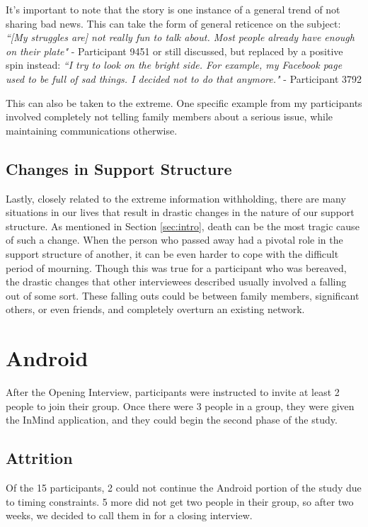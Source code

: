   It's important to note that the story is one instance of a general
  trend of not sharing bad news.
  This can take the form of general reticence on the subject:
  \textit{
  ``[My struggles are] not really fun to talk about.
  Most people already have enough on their plate"
  }
  - Participant 9451
  or still discussed, but replaced by a positive spin instead:
  \textit{
  ``I try to look on the bright side.
  For example, my Facebook page used to be full of sad things.
  I decided not to do that anymore."
  } - Participant 3792
  
  This can also be taken to the extreme.
  One specific example from my participants involved
  completely not telling family members about a serious issue,
  while maintaining communications otherwise.

  \subsection{Changes in Support Structure}
  Lastly, closely related to the extreme information withholding,
  there are many situations in our lives that result in
  drastic changes in the nature of our support structure.
  As mentioned in Section \ref{sec:intro},
  death can be the most tragic cause of such a change.
  When the person who passed away had a pivotal role in the support
  structure of another, it can be even harder to cope with
  the difficult period of mourning.
  Though this was true for a participant who was bereaved,
  the drastic changes that other interviewees described usually involved
  a falling out of some sort.
  These falling outs could be between family members,
  significant others, or even friends,
  and completely overturn an existing network.

\section{Android}
  After the Opening Interview, participants were instructed to invite
  at least 2 people to join their group.
  Once there were 3 people in a group,
  they were given the InMind application,
  and they could begin the second phase of the study.

  \subsection{Attrition}
    \label{sec:Android}
    Of the 15 participants, 2 could not continue the Android portion
    of the study due to timing constraints.
    5 more did not get two people in their group,
    so after two weeks,
    we decided to call them in for a closing interview.

